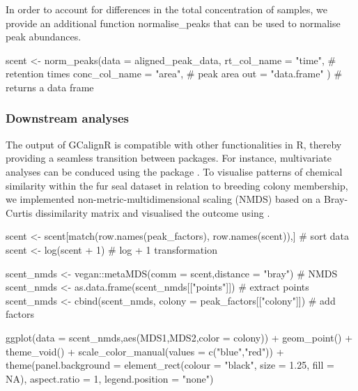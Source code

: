 In order to account for differences in the total concentration of
samples, we provide an additional function normalise\_peaks that can be
used to normalise peak abundances.

\begin{Schunk}
\begin{Sinput}
scent <- norm_peaks(data = aligned_peak_data,
                    rt_col_name = "time", # retention times
                    conc_col_name = "area", # peak area
                    out = "data.frame" ) # returns a data frame
\end{Sinput}
\end{Schunk}

\subsubsection{Downstream analyses}\label{downstream-analyses}

The output of GCalignR is compatible with other functionalities in R,
thereby providing a seamless transition between packages. For instance,
multivariate analyses can be conduced using the package . To
visualise patterns of chemical similarity within the fur seal dataset in
relation to breeding colony membership, we implemented
non-metric-multidimensional scaling (NMDS) based on a Bray-Curtis
dissimilarity matrix and visualised the outcome using
\href{https://CRAN.R-project.org/package=ggplot2}{}
\citep{Wickham.2009}.

\begin{Schunk}
\begin{Sinput}
scent <- scent[match(row.names(peak_factors),
                     row.names(scent)),] # sort data 
scent <- log(scent + 1) # log + 1 transformation
\end{Sinput}
\end{Schunk}

\begin{Schunk}
\begin{Sinput}
scent_nmds <- vegan::metaMDS(comm = scent,distance = "bray") # NMDS
scent_nmds <- as.data.frame(scent_nmds[["points"]]) # extract points
scent_nmds <- cbind(scent_nmds,
                    colony = peak_factors[["colony"]]) # add factors
\end{Sinput}
\end{Schunk}

\begin{Schunk}
\begin{Sinput}
ggplot(data = scent_nmds,aes(MDS1,MDS2,color = colony)) +
    geom_point() + 
    theme_void() + 
    scale_color_manual(values = c("blue","red")) +
    theme(panel.background = element_rect(colour = "black", size = 1.25,
            fill = NA), aspect.ratio = 1, legend.position = "none")
\end{Sinput}
\end{Schunk}

